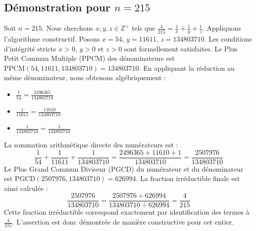 \documentclass[11pt,a4paper]{article}
\begin{document}
\subsection{Démonstration pour $n = 215$}
Soit $n = 215$. Nous cherchons $x, y, z \in \mathbb{Z}^{+}$ tels que $\frac{4}{215} = \frac{1}{x} + \frac{1}{y} + \frac{1}{z}$.
Appliquons l'algorithme constructif. Posons $x = 54$, $y = 11611$, $z = 134803710$.
Les conditions d'intégrité stricte $x > 0$, $y > 0$ et $z > 0$ sont formellement satisfaites.
Le Plus Petit Commun Multiple (PPCM) des dénominateurs est $\text{PPCM}(54, 11611, 134803710) = 134803710$.
En appliquant la réduction au même dénominateur, nous obtenons algébriquement :
\begin{itemize}
    \item $\frac{1}{54} = \frac{2496365}{134803710}$
    \item $\frac{1}{11611} = \frac{11610}{134803710}$
    \item $\frac{1}{134803710} = \frac{1}{134803710}$
\end{itemize}
La sommation arithmétique directe des numérateurs est :
$$ \frac{1}{54} + \frac{1}{11611} + \frac{1}{134803710} = \frac{2496365 + 11610 + 1}{134803710} = \frac{2507976}{134803710} $$
Le Plus Grand Commun Diviseur (PGCD) du numérateur et du dénominateur est $\text{PGCD}(2507976, 134803710) = 626994$.
La fraction irréductible finale est ainsi calculée :
$$ \frac{2507976}{134803710} = \frac{2507976 \div 626994}{134803710 \div 626994} = \frac{4}{215} $$
Cette fraction irréductible correspond exactement par identification des termes à $\frac{4}{215}$. L'assertion est donc démontrée de manière constructive pour cet entier.
\end{document}
